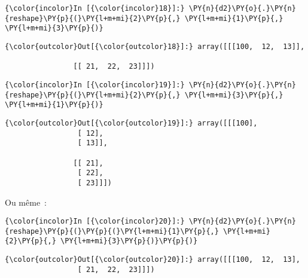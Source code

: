     \begin{Verbatim}[commandchars=\\\{\},frame=single,framerule=0.3mm,rulecolor=\color{cellframecolor}]
{\color{incolor}In [{\color{incolor}18}]:} \PY{n}{d2}\PY{o}{.}\PY{n}{reshape}\PY{p}{(}\PY{l+m+mi}{2}\PY{p}{,} \PY{l+m+mi}{1}\PY{p}{,} \PY{l+m+mi}{3}\PY{p}{)}
\end{Verbatim}


\begin{Verbatim}[commandchars=\\\{\},frame=single,framerule=0.3mm,rulecolor=\color{cellframecolor}]
{\color{outcolor}Out[{\color{outcolor}18}]:} array([[[100,  12,  13]],
         
                [[ 21,  22,  23]]])
\end{Verbatim}
            
    \begin{Verbatim}[commandchars=\\\{\},frame=single,framerule=0.3mm,rulecolor=\color{cellframecolor}]
{\color{incolor}In [{\color{incolor}19}]:} \PY{n}{d2}\PY{o}{.}\PY{n}{reshape}\PY{p}{(}\PY{l+m+mi}{2}\PY{p}{,} \PY{l+m+mi}{3}\PY{p}{,} \PY{l+m+mi}{1}\PY{p}{)}
\end{Verbatim}


\begin{Verbatim}[commandchars=\\\{\},frame=single,framerule=0.3mm,rulecolor=\color{cellframecolor}]
{\color{outcolor}Out[{\color{outcolor}19}]:} array([[[100],
                 [ 12],
                 [ 13]],
         
                [[ 21],
                 [ 22],
                 [ 23]]])
\end{Verbatim}
            
    Ou même~:

    \begin{Verbatim}[commandchars=\\\{\},frame=single,framerule=0.3mm,rulecolor=\color{cellframecolor}]
{\color{incolor}In [{\color{incolor}20}]:} \PY{n}{d2}\PY{o}{.}\PY{n}{reshape}\PY{p}{(}\PY{p}{(}\PY{l+m+mi}{1}\PY{p}{,} \PY{l+m+mi}{2}\PY{p}{,} \PY{l+m+mi}{3}\PY{p}{)}\PY{p}{)}
\end{Verbatim}


\begin{Verbatim}[commandchars=\\\{\},frame=single,framerule=0.3mm,rulecolor=\color{cellframecolor}]
{\color{outcolor}Out[{\color{outcolor}20}]:} array([[[100,  12,  13],
                 [ 21,  22,  23]]])
\end{Verbatim}
            
